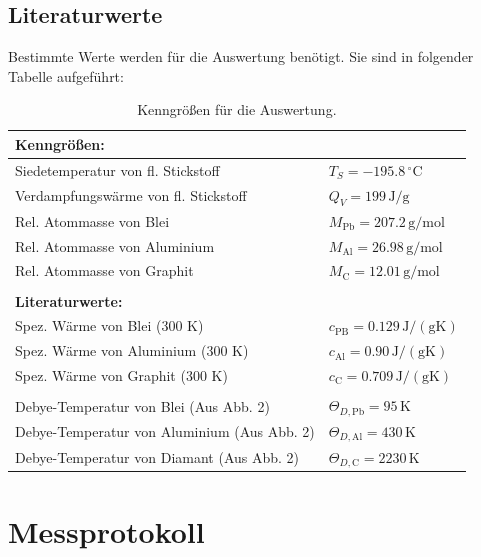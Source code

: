 \documentclass[12pt,a4paper,titlepage]{scrartcl}
\numberwithin{equation}{section}
\numberwithin{table}{section}
\numberwithin{figure}{section}
\begin{document}
\subsection{Literaturwerte}

Bestimmte Werte werden für die Auswertung benötigt. Sie sind in folgender Tabelle aufgeführt:
\begin{table}[H]
    \centering
    \caption{Kenngrößen für die Auswertung.}
    \begin{tabular}{ll}
        \textbf{Kenngrößen:} \\
        \midrule
        Siedetemperatur von fl. Stickstoff & $T_S = -195.8\,^{\circ}\mathrm{C}$ \\ 
        Verdampfungswärme von fl. Stickstoff & $Q_V = 199\,\mathrm{J/g}$ \\ 
        Rel. Atommasse von Blei & $M_{\mathrm{Pb}} = 207.2\,\mathrm{g/mol}$ \\ 
        Rel. Atommasse von Aluminium & $M_{\mathrm{Al}} = 26.98\,\mathrm{g/mol}$ \\ 
        Rel. Atommasse von Graphit & $M_{\mathrm{C}} = 12.01\,\mathrm{g/mol}$ \\ 
        \bottomrule
        & \\
        \multicolumn{2}{l}{\textbf{Literaturwerte:}} \\ 
        \midrule
        Spez. Wärme von Blei (300 K) & $c_{\mathrm{PB}} = 0.129\,\mathrm{J/(gK)}$ \\ 
        Spez. Wärme von Aluminium (300 K) & $c_{\mathrm{Al}} = 0.90\,\mathrm{J/(gK)}$ \\ 
        Spez. Wärme von Graphit (300 K) & $c_{\mathrm{C}} = 0.709\,\mathrm{J/(gK)}$ \\ 
        & \\
        Debye-Temperatur von Blei (Aus Abb. 2) & $\Theta_{D,\mathrm{Pb}} = 95\,\mathrm{K}$ \\ 
        Debye-Temperatur von Aluminium (Aus Abb. 2) & $\Theta_{D,\mathrm{Al}} = 430\,\mathrm{K}$ \\ 
        Debye-Temperatur von Diamant (Aus Abb. 2) & $\Theta_{D,\mathrm{C}} = 2230\,\mathrm{K}$ \\ 
        \bottomrule
    \end{tabular}
\end{table}



\section{Messprotokoll}
\end{document}
